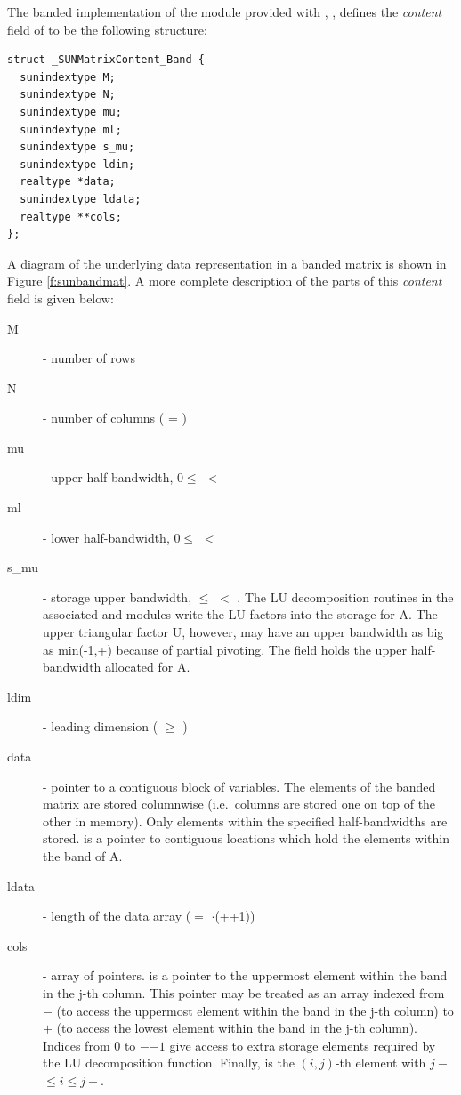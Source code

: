 
The banded implementation of the {\sunmatrix} module provided with
{\sundials}, {\sunmatband}, defines the {\em content} field
of  to be the following structure:
\begin{verbatim} 
struct _SUNMatrixContent_Band {
  sunindextype M;
  sunindextype N;
  sunindextype mu;
  sunindextype ml;
  sunindextype s_mu;
  sunindextype ldim;
  realtype *data;
  sunindextype ldata;
  realtype **cols;
};
\end{verbatim}
A diagram of the underlying data representation in a banded matrix is
shown in Figure \ref{f:sunbandmat}.  A more complete description of the
parts of this \emph{content} field is given below:
\begin{description}
  \item[M] - number of rows
  \item[N] - number of columns ( = )
  \item[mu] - upper half-bandwidth, $0 \le$  $<$ 
  \item[ml] - lower half-bandwidth, $0 \le$  $<$ 
  \item[s\_mu] - storage upper bandwidth,  $\le$  $<$ .
    The LU decomposition routines in the associated {\sunlinsolband}
    and {\sunlinsollapband} modules write the LU factors into the
    storage for A. The upper triangular factor U, however, may have  
    an upper bandwidth as big as min(-1,+) because of 
    partial pivoting. The  field holds the upper
  half-bandwidth allocated for A.
  \item[ldim] - leading dimension ( $\ge$ )
  \item[data] - pointer to a contiguous block of  variables.
    The elements of the banded matrix are stored columnwise
    (i.e.~columns are stored one on top of the other in memory). Only
    elements within the specified half-bandwidths are stored.     
     is a pointer to  contiguous locations   
    which hold the elements within the band of A.  
  \item[ldata] - length of the data array
    ($=$ $\cdot$(++1)) 
  \item[cols] - array of pointers.  is a pointer to the
    uppermost element within the band in the j-th column. This pointer
    may be treated as an array indexed from $-$ (to
    access the uppermost element within the band in the j-th column)
    to $+$ (to access the lowest element within the
    band in the j-th column). Indices from $0$ to
    $-$$-1$ give access to extra storage elements
    required by the LU decomposition function.
    Finally,  is the $(i,j)$-th element with
    $j-$ $\le i \le j+$.  
\end{description}
